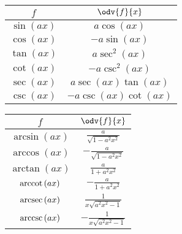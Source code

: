 \documentclass{article}
\begin{document}
\begin{table}[H]
    \renewcommand*{\arraystretch}{1.5}
    \centering
    \begin{tabular}{c c}
        \toprule
        \(f\)                       & \(\odv{f}{x}\)                                        \\
        \midrule
        \(\sin{\left( ax \right)}\) & \(a\cos{\left( ax \right)}\)                         \\
        \(\cos{\left( ax \right)}\) & \(-a\sin{\left( ax \right)}\)                        \\
        \(\tan{\left( ax \right)}\) & \(a\sec^2{\left( ax \right)}\)                       \\
        \(\cot{\left( ax \right)}\) & \(-a\csc^2{\left( ax \right)}\)                      \\
        \(\sec{\left( ax \right)}\) & \(a\sec{\left( ax \right)}\tan{\left( ax \right)}\)  \\
        \(\csc{\left( ax \right)}\) & \(-a\csc{\left( ax \right)}\cot{\left( ax \right)}\) \\[5pt]
        \bottomrule
    \end{tabular}
    \begin{tabular}{c c}
        \toprule
        \(f\)                          & \(\odv{f}{x}\)                                   \\
        \midrule
        \(\arcsin{\left( ax \right)}\) & \(\displaystyle  \frac{a}{\sqrt{1-a^2x^2}}\)    \\[8pt]
        \(\arccos{\left( ax \right)}\) & \(\displaystyle -\frac{a}{\sqrt{1-a^2x^2}}\)    \\[8pt]
        \(\arctan{\left( ax \right)}\) & \(\displaystyle  \frac{a}{1+a^2x^2}\)           \\[8pt]
        \(\arccot{\left( ax \right)}\) & \(\displaystyle -\frac{a}{1+a^2x^2}\)           \\[8pt]
        \(\arcsec{\left( ax \right)}\) & \(\displaystyle  \frac{1}{x\sqrt{a^2x^2 - 1}}\) \\[8pt]
        \(\arccsc{\left( ax \right)}\) & \(\displaystyle -\frac{1}{x\sqrt{a^2x^2 - 1}}\) \\[8pt]
        \bottomrule
    \end{tabular}
\end{table}
\end{document}
